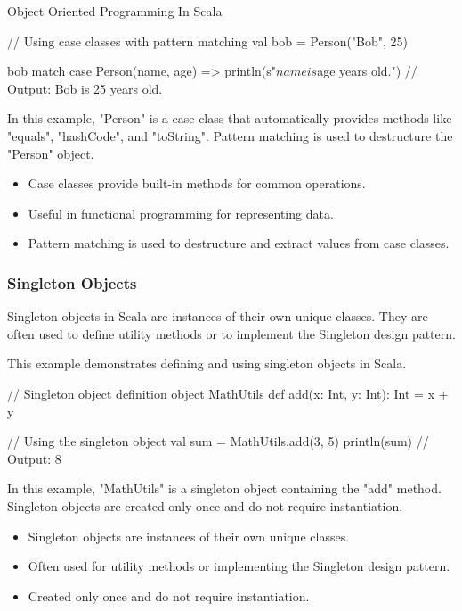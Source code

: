 \begin{notes}{Object Oriented Programming In Scala}
\begin{highlight}
\begin{code}[Scala]
    // Using case classes with pattern matching
    val bob = Person("Bob", 25)
    
    bob match {
        case Person(name, age) => println(s"$name is $age years old.")
    }  // Output: Bob is 25 years old.
    \end{code}
    
        In this example, "Person" is a case class that automatically provides methods like "equals", "hashCode", and "toString". Pattern matching is used to destructure the "Person" object.
    
        \begin{itemize}
            \item Case classes provide built-in methods for common operations.
            \item Useful in functional programming for representing data.
            \item Pattern matching is used to destructure and extract values from case classes.
        \end{itemize}
    
    \end{highlight}
    
    \subsubsection*{Singleton Objects}
    
    Singleton objects in Scala are instances of their own unique classes. They are often used to define utility methods or to implement the Singleton design pattern.
    
    \begin{highlight}
    
        This example demonstrates defining and using singleton objects in Scala.
    
    \begin{code}[Scala]
    // Singleton object definition
    object MathUtils {
        def add(x: Int, y: Int): Int = x + y
    }
    
    // Using the singleton object
    val sum = MathUtils.add(3, 5)
    println(sum)  // Output: 8
    \end{code}
    
        In this example, "MathUtils" is a singleton object containing the "add" method. Singleton objects are created only once and do not require instantiation.
    
        \begin{itemize}
            \item Singleton objects are instances of their own unique classes.
            \item Often used for utility methods or implementing the Singleton design pattern.
            \item Created only once and do not require instantiation.
        \end{itemize}
    

\end{highlight}
\end{notes}
